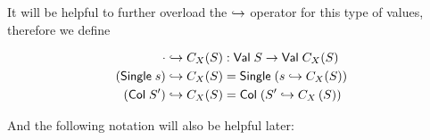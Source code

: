 
It will be helpful to further overload the $\hookrightarrow$ operator for this type of values, therefore we define


\begin{align}
    \cdot \hookrightarrow C_X(S) &: \mathsf{Val} \; S \rightarrow \mathsf{Val} \; C_X(S) \\
    (\mathsf{Single} \; s) \hookrightarrow C_X(S) &= \mathsf{Single} \; (s \hookrightarrow C_X(S)) \\
    (\mathsf{Col} \; S') \hookrightarrow C_X(S) &= \mathsf{Col} \; (S' \hookrightarrow C_X\left(S\right))
\end{align}


And the following notation will also be helpful later:


